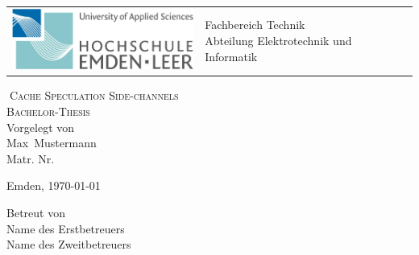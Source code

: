 \begin{titlepage}

\vspace{-0.5cm}
\hspace{-2.0cm}
\begin{tabular}{p{8.0cm} p{8.0cm}}
  \includegraphics[width = 6.0cm]{img/hsel-allgemein} &
   \parbox[b]{8.0cm}{
     {\large 	Fachbereich Technik }\\
     {\large 	Abteilung Elektrotechnik und Informatik }     
    } \\
   \\
   \hline
\end{tabular}
%
\begin{center}

\vspace{2.5cm}%
\LARGE{\textsc{ %
Cache Speculation Side-channels}}\\

\vspace{2.5cm}%
\LARGE{\textsc{%
{Bachelor-Thesis}
}}\\

\vspace{2cm}%
\large
Vorgelegt von\\ Max~Mustermann\\ Matr. Nr. 

\vspace{1cm} 
Emden, \today

\vspace{3.5cm}%
Betreut von\\ Name des Erstbetreuers\\ Name des Zweitbetreuers

\end{center}
\normalsize
\end{titlepage}
